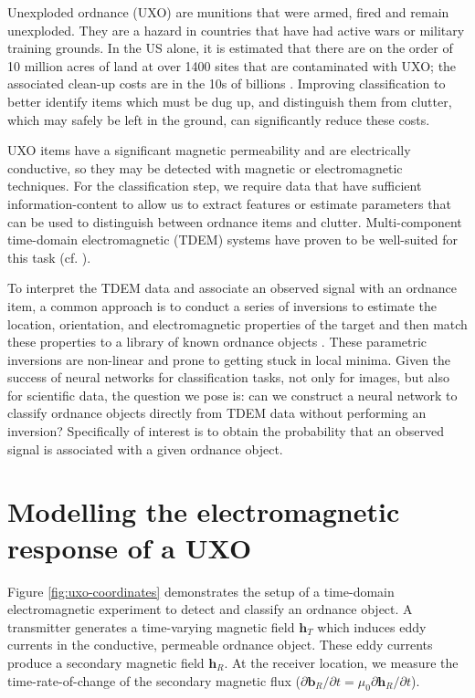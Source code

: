 \documentclass{segabs}
\begin{document}
Unexploded ordnance (UXO) are munitions that were armed, fired and remain unexploded. They are a hazard in countries that have had active wars or military training grounds. In the US alone, it is estimated that there are on the order of 10 million acres of land at over 1400 sites that are contaminated with UXO; the associated clean-up costs are in the 10s of billions \citep{Etter2003}. Improving classification to better identify items  which must be dug up, and distinguish them from clutter, which may safely be left in the ground, can significantly reduce these costs.

UXO items have a significant magnetic permeability and are electrically conductive, so they may be detected with magnetic or electromagnetic techniques. For the classification step, we require data that have sufficient information-content to allow us to extract features or estimate parameters that can be used to distinguish between ordnance items and clutter. Multi-component time-domain electromagnetic (TDEM) systems have proven to be well-suited for this task (cf. \cite{Bell2001, Pasion2001, Zhang2003, Billings2010}).

To interpret the TDEM data and associate an observed signal with an ordnance item, a common approach is to conduct a series of inversions to estimate the location, orientation, and electromagnetic properties of the target and then match these properties to a library of known ordnance objects \cite{Andrews2011, Beran2013}. These parametric inversions are non-linear and prone to getting stuck in local minima. Given the success of neural networks for classification tasks, not only for images, but also for scientific data, the question we pose is: can we construct a neural network to classify ordnance objects directly from TDEM data without performing an inversion? Specifically of interest is to obtain the probability that an observed signal is associated with a given ordnance object.

\vspace{-0.45cm}
\section{Modelling the electromagnetic response of a UXO}
\vspace{-0.25cm}

Figure \ref{fig:uxo-coordinates} demonstrates the setup of a time-domain electromagnetic experiment to detect and classify an ordnance object. A transmitter generates a time-varying magnetic field $\mathbf{h}_T$ which induces eddy currents in the conductive, permeable ordnance object. These eddy currents produce a secondary magnetic field $\mathbf{h}_R$. At the receiver location, we measure the time-rate-of-change of the secondary magnetic flux ($\partial \mathbf{b}_R/\partial t = \mu_0 \partial \mathbf{h}_R/\partial t$).
\end{document}
